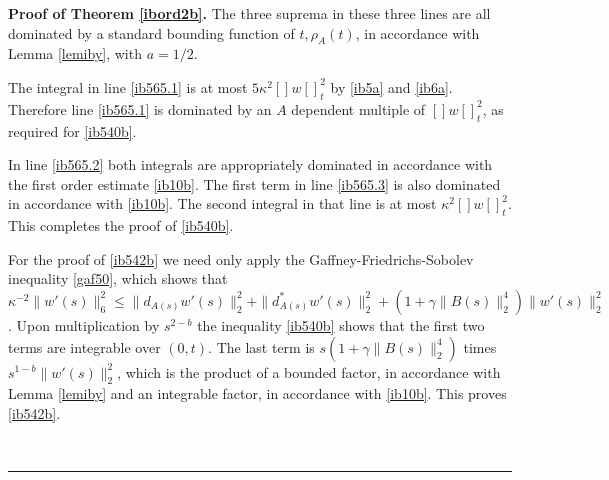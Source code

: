 \documentclass[12pt]{article}
\newenvironment{proof}[1][Proof]{\textbf{#1.} }{\ \rule{0.5em}{0.5em}}
\def \nn{[]}
\def \eref{\eqref}
\numberwithin{equation}{section}
\begin{document}
\begin{proof}[Proof of Theorem \ref{ibord2b}]
The three suprema in these three lines are all dominated by a standard bounding
function of $t, \rho_A(t)$, in accordance with Lemma \ref{lemiby}, with $a =1/2$.

    The integral in line \eref{ib565.1}  is at most $5\kappa^2 \nn w\nn_t^2$
     by \eref{ib5a} and \eref{ib6a}. Therefore 
    line \eref{ib565.1} is dominated by an $A$ dependent multiple of $\nn w\nn_t^2$,
    as required for \eref{ib540b}.
    
       
    In line \eref{ib565.2}    
   both integrals are appropriately  dominated in accordance with
     the first order estimate \eref{ib10b}. 
   The first term in line \eref{ib565.3} is also dominated in accordance with \eref{ib10b}.
   The second integral in that line is at most      $\kappa^2 \nn w\nn_t^2$. 
    This completes the proof of \eref{ib540b}.
  
      
          For the proof of \eref{ib542b} we need only apply the Gaffney-Friedrichs-Sobolev inequality
   \eref{gaf50}, which shows that 
   $\kappa^{-2} \| w'(s)\|_6^2 \le \| d_{A(s)} w'(s)\|_2^2 +\| d_{A(s)}^* w'(s)\|_2^2  
   + (1 + \gamma \|B(s)\|_2^4)  \|w'(s)\|_2^2$. Upon multiplication by $s^{2-b}$ the
    inequality \eref{ib540b} shows that the first two terms are integrable over $(0, t)$.
     The last term is $s(1 + \gamma \|B(s)\|_2^4)$  times  $s^{1-b} \|w'(s)\|_2^2$, which is the product of a bounded factor, in accordance with Lemma \ref{lemiby}
  and an integrable factor, in accordance with  \eref{ib10b}. This proves \eref{ib542b}.




\end{proof}
\end{document}
